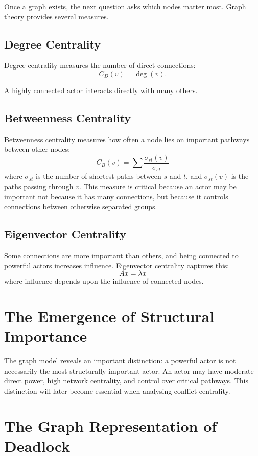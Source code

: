 \documentclass[11pt,openany]{book}
\theoremstyle{plain}
\theoremstyle{definition}
\begin{document}
Once a graph exists, the next question asks which nodes matter most. Graph theory provides several measures.

\subsection*{Degree Centrality}

Degree centrality measures the number of direct connections:
\[
C_D(v) = \deg(v).
\]

A highly connected actor interacts directly with many others.

\subsection*{Betweenness Centrality}

Betweenness centrality measures how often a node lies on important pathways between other nodes:
\[
C_B(v) = \sum \frac{\sigma_{st}(v)}{\sigma_{st}}
\]
where \(\sigma_{st}\) is the number of shortest paths between \(s\) and \(t\), and \(\sigma_{st}(v)\) is the paths passing through \(v\). This measure is critical because an actor may be important not because it has many connections, but because it controls connections between otherwise separated groups.

\subsection*{Eigenvector Centrality}

Some connections are more important than others, and being connected to powerful actors increases influence. Eigenvector centrality captures this:
\[
A x = \lambda x
\]
where influence depends upon the influence of connected nodes.

\section*{The Emergence of Structural Importance}

The graph model reveals an important distinction: a powerful actor is not necessarily the most structurally important actor. An actor may have moderate direct power, high network centrality, and control over critical pathways. This distinction will later become essential when analysing conflict-centrality.

\section*{The Graph Representation of Deadlock}
\end{document}
